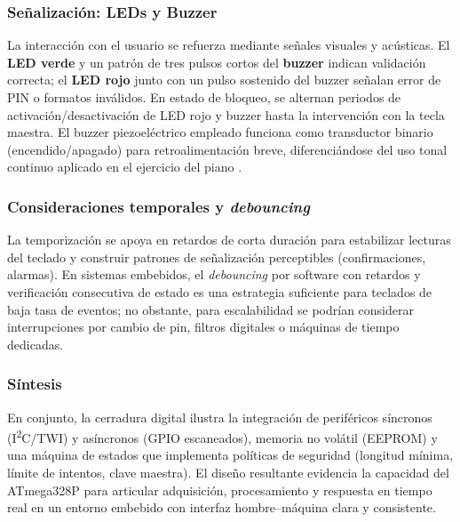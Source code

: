 \subsubsection{Señalización: LEDs y Buzzer}
La interacción con el usuario se refuerza mediante señales visuales y acústicas. El \textbf{LED verde} y un patrón de tres pulsos cortos del \textbf{buzzer} indican validación correcta; el \textbf{LED rojo} junto con un pulso sostenido del buzzer señalan error de PIN o formatos inválidos. En estado de bloqueo, se alternan periodos de activación/desactivación de LED rojo y buzzer hasta la intervención con la tecla maestra. El buzzer piezoeléctrico empleado funciona como transductor binario (encendido/apagado) para retroalimentación breve, diferenciándose del uso tonal continuo aplicado en el ejercicio del piano \cite{buzzer_emx7t05sp_datasheet}.

\subsubsection{Consideraciones temporales y \textit{debouncing}}
La temporización se apoya en retardos de corta duración para estabilizar lecturas del teclado y construir patrones de señalización perceptibles (confirmaciones, alarmas). En sistemas embebidos, el \textit{debouncing} por software con retardos y verificación consecutiva de estado es una estrategia suficiente para teclados de baja tasa de eventos; no obstante, para escalabilidad se podrían considerar interrupciones por cambio de pin, filtros digitales o máquinas de tiempo dedicadas.

\subsubsection{Síntesis}
En conjunto, la cerradura digital ilustra la integración de periféricos síncronos (I\textsuperscript{2}C/TWI) y asíncronos (GPIO escaneados), memoria no volátil (EEPROM) y una máquina de estados que implementa políticas de seguridad (longitud mínima, límite de intentos, clave maestra). El diseño resultante evidencia la capacidad del ATmega328P para articular adquisición, procesamiento y respuesta en tiempo real en un entorno embebido con interfaz hombre–máquina clara y consistente.

